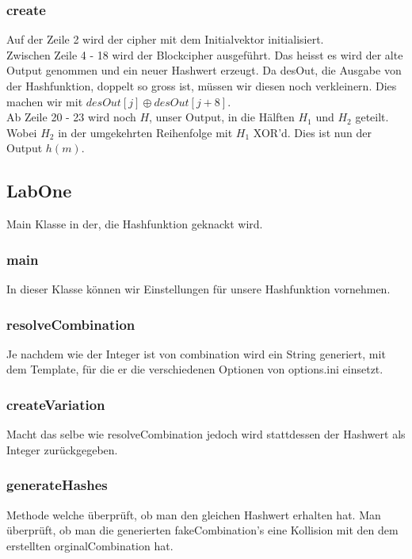 \documentclass[12pt]{scrartcl}
\begin{document}
\subsubsection{create}

Auf der Zeile 2 wird der cipher mit dem Initialvektor initialisiert.\\
Zwischen Zeile 4 - 18 wird der Blockcipher ausgeführt. Das heisst es wird der alte Output genommen und ein neuer Hashwert erzeugt. Da desOut, die Ausgabe von der Hashfunktion, doppelt so gross ist, müssen wir diesen noch verkleinern. Dies machen wir mit $desOut[j] \oplus desOut[j + 8]$.\\
Ab Zeile 20 - 23 wird noch $H$, unser Output, in die Hälften $H_1$ und $H_2$ geteilt. Wobei $H_2$ in der umgekehrten Reihenfolge mit $H_1$ XOR'd. Dies ist nun der Output $h(m)$.
\subsection{LabOne}
Main Klasse in der, die Hashfunktion geknackt wird.
\subsubsection{main}
In dieser Klasse können wir Einstellungen für unsere Hashfunktion vornehmen.
\subsubsection{resolveCombination}
Je nachdem wie der Integer ist von combination wird ein String generiert, mit dem Template, für die er die verschiedenen Optionen von options.ini einsetzt.
\subsubsection{createVariation}
Macht das selbe wie resolveCombination jedoch wird stattdessen der Hashwert als Integer zurückgegeben.
\subsubsection{generateHashes}

Methode welche überprüft, ob man den gleichen Hashwert erhalten hat. Man überprüft, ob man die generierten fakeCombination's eine Kollision mit den dem erstellten orginalCombination hat.


 
 
\end{document}
